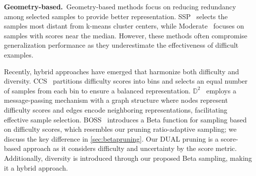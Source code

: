 \noindent\textbf{Geometry-based.}~Geometry-based methods focus on reducing redundancy among selected samples to provide better representation. 
SSP~\citep{sorscher2022beyond} selects the samples most distant from k-means cluster centers, while Moderate~\citep{xia2022moderate} focuses on samples with scores near the median.
However, these methods often compromise generalization performance as they underestimate the effectiveness of difficult examples.

Recently, hybrid approaches have emerged that harmonize both difficulty and diversity. CCS~\citep{zheng2022coverage} partitions difficulty scores into bins and selects an equal number of samples from each bin to ensure a balanced representation.
$\mathbb{D}^2$~\citep{maharana2023d2} employs a message-passing mechanism with a graph structure where nodes represent difficulty scores and edges encode neighboring representations, facilitating effective sample selection. BOSS~\citep{acharyabalancing} introduces a Beta function for sampling based on difficulty scores, which resembles our pruning ratio-adaptive sampling; we discuss the key difference in \cref{sec:betapruning}. 
Our DUAL pruning is a score-based approach as it considers difficulty and uncertainty by the score metric. Additionally, diversity is introduced through our proposed Beta sampling, making it a hybrid approach.